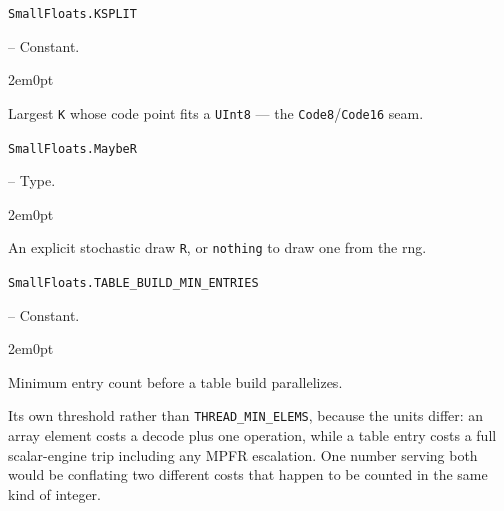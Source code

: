 \par\medskip\noindent\begin{minipage}{\linewidth}
\hypertarget{6819318616108702912}{\texttt{SmallFloats.KSPLIT}}  -- {Constant.}
\nopagebreak
\begin{adjustwidth}{2em}{0pt}

Largest \texttt{K} whose code point fits a \texttt{UInt8} — the \texttt{Code8}/\allowbreak\texttt{Code16} seam.



\end{adjustwidth}
\end{minipage}
\par\medskip

\par\medskip\noindent\begin{minipage}{\linewidth}
\hypertarget{6899126343738372503}{\texttt{SmallFloats.MaybeR}}  -- {Type.}
\nopagebreak
\begin{adjustwidth}{2em}{0pt}

An explicit stochastic draw \texttt{R}, or \texttt{nothing} to draw one from the rng.



\end{adjustwidth}
\end{minipage}
\par\medskip

\par\medskip\noindent\begin{minipage}{\linewidth}
\hypertarget{11007231064200409171}{\texttt{SmallFloats.TABLE\_\allowbreak{}BUILD\_\allowbreak{}MIN\_\allowbreak{}ENTRIES}}  -- {Constant.}
\nopagebreak
\begin{adjustwidth}{2em}{0pt}

Minimum entry count before a table build parallelizes.

Its own threshold rather than \texttt{THREAD\_\allowbreak{}MIN\_\allowbreak{}ELEMS}, because the units differ: an array element costs a decode plus one operation, while a table entry costs a full scalar-engine trip including any MPFR escalation. One number serving both would be conflating two different costs that happen to be counted in the same kind of integer.



\end{adjustwidth}
\end{minipage}
\par\medskip

